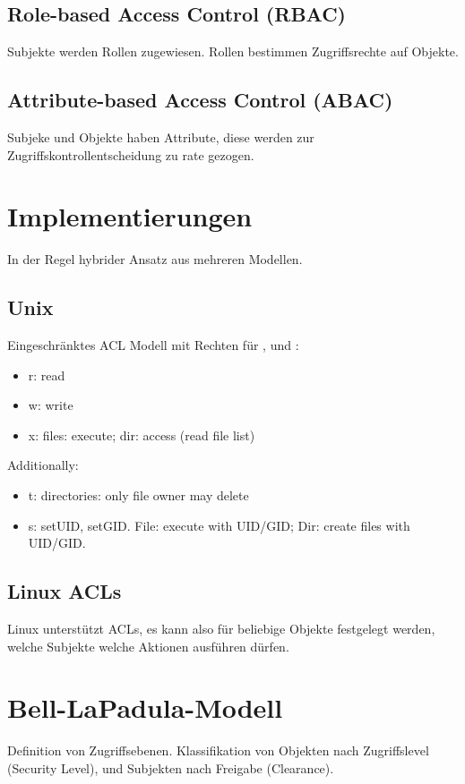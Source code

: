 \subsection{Role-based Access Control (RBAC)}
Subjekte werden Rollen zugewiesen. Rollen bestimmen Zugriffsrechte auf Objekte.

\subsection{Attribute-based Access Control (ABAC)}
Subjeke und Objekte haben Attribute, diese werden zur Zugriffskontrollentscheidung zu rate gezogen.

\section{Implementierungen}
In der Regel hybrider Ansatz aus mehreren Modellen.

\subsection{Unix}
Eingeschränktes ACL Modell mit Rechten für ,  und :
\begin{itemize}
    \item r: read
    \item w: write
    \item x: files: execute; dir: access (read file list)
\end{itemize}
Additionally:
\begin{itemize}
    \item t: directories: only file owner may delete
    \item s: setUID, setGID. File: execute with UID/GID; Dir: create files with UID/GID.
\end{itemize}

\subsection{Linux ACLs}
Linux unterstützt ACLs, es kann also für beliebige Objekte festgelegt werden, welche Subjekte welche Aktionen ausführen dürfen.

\section{Bell-LaPadula-Modell}
Definition von Zugriffsebenen. 
Klassifikation von Objekten nach Zugriffslevel (Security Level),
und Subjekten nach Freigabe (Clearance).

